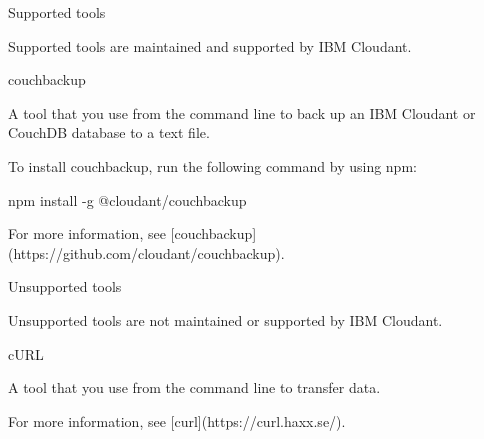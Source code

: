 \documentclass[a4paper,11pt]{article}
\begin{document}
\begin{docenv}
{ Supported tools 

Supported tools are maintained and supported by IBM Cloudant.



 couchbackup 

A tool that you use from the command line to back up an IBM Cloudant or CouchDB database to a text file.

To install couchbackup, run the following command by using npm:

npm install -g @cloudant/couchbackup

For more information, see [couchbackup](https://github.com/cloudant/couchbackup).







 Unsupported tools 

Unsupported tools are not maintained or supported by IBM Cloudant.



 cURL 

A tool that you use from the command line to transfer data.

For more information, see [curl](https://curl.haxx.se/).}
\end{docenv}
\end{document}
